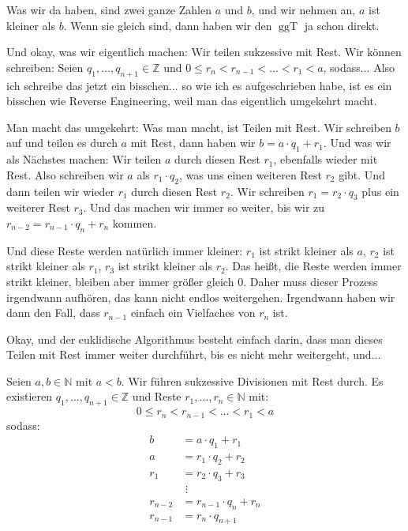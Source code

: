 \begin{spoken-clean}[00:30:44 - 00:33:37]
Was wir da haben, sind zwei ganze Zahlen $a$ und $b$, und wir nehmen an, $a$ ist kleiner als $b$. Wenn sie gleich sind, dann haben wir den $\operatorname{ggT}$ ja schon direkt.

Und okay, was wir eigentlich machen: Wir teilen sukzessive mit Rest. Wir können schreiben: Seien $q_1, \dots, q_{n+1} \in \mathbb{Z}$ und $0 \le r_n < r_{n-1} < \dots < r_1 < a$, sodass... Also ich schreibe das jetzt ein bisschen... so wie ich es aufgeschrieben habe, ist es ein bisschen wie Reverse Engineering, weil man das eigentlich umgekehrt macht.

Man macht das umgekehrt: Was man macht, ist Teilen mit Rest. Wir schreiben $b$ auf und teilen es durch $a$ mit Rest, dann haben wir $b = a \cdot q_1 + r_1$. Und was wir als Nächstes machen: Wir teilen $a$ durch diesen Rest $r_1$, ebenfalls wieder mit Rest. Also schreiben wir $a$ als $r_1 \cdot q_2$, was uns einen weiteren Rest $r_2$ gibt. Und dann teilen wir wieder $r_1$ durch diesen Rest $r_2$. Wir schreiben $r_1 = r_2 \cdot q_3$ plus ein weiterer Rest $r_3$. Und das machen wir immer so weiter, bis wir zu $r_{n-2} = r_{n-1} \cdot q_n + r_n$ kommen.

Und diese Reste werden natürlich immer kleiner: $r_1$ ist strikt kleiner als $a$, $r_2$ ist strikt kleiner als $r_1$, $r_3$ ist strikt kleiner als $r_2$. Das heißt, die Reste werden immer strikt kleiner, bleiben aber immer größer gleich $0$. Daher muss dieser Prozess irgendwann aufhören, das kann nicht endlos weitergehen. Irgendwann haben wir dann den Fall, dass $r_{n-1}$ einfach ein Vielfaches von $r_n$ ist.

Okay, und der euklidische Algorithmus besteht einfach darin, dass man dieses Teilen mit Rest immer weiter durchführt, bis es nicht mehr weitergeht, und...
\end{spoken-clean}

\begin{math-stroke}
Seien $a, b \in \mathbb{N}$ mit $a < b$. Wir führen sukzessive Divisionen mit Rest durch. Es existieren $q_1, \dots, q_{n+1} \in \mathbb{Z}$ und Reste $r_1, \dots, r_n \in \mathbb{N}$ mit:
\[ 0 \le r_n < r_{n-1} < \dots < r_1 < a \]
sodass:
\begin{align}
b &= a \cdot q_1 + r_1 \label{eq:euclid-step1} \\
a &= r_1 \cdot q_2 + r_2 \label{eq:euclid-step2} \\
r_1 &= r_2 \cdot q_3 + r_3 \label{eq:euclid-step3} \\
&\,\,\vdots \nonumber \\
r_{n-2} &= r_{n-1} \cdot q_n + r_n \label{eq:euclid-step-n-1} \\
r_{n-1} &= r_n \cdot q_{n+1} \label{eq:euclid-step-n}
\end{align}
\end{math-stroke}

